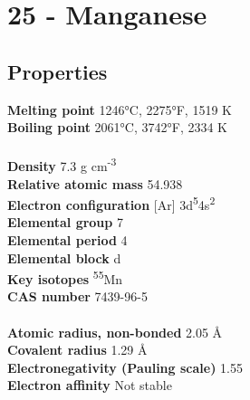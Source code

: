 \section{25 - Manganese}
\label{sec:elem-manganese}
\subsection{Properties}
\textbf{Melting point} 1246°C, 2275°F, 1519 K\\
\textbf{Boiling point} 2061°C, 3742°F, 2334 K\\
\\
\textbf{Density} 7.3 g cm\textsuperscript{-3}\\
\textbf{Relative atomic mass} 54.938\\
\textbf{Electron configuration} [Ar] 3d\textsuperscript{5}4s\textsuperscript{2}\\
\textbf{Elemental group} 7\\
\textbf{Elemental period} 4\\
\textbf{Elemental block} d\\
\textbf{Key isotopes} \textsuperscript{55}Mn\\
\textbf{CAS number} 7439-96-5\\
\\
\textbf{Atomic radius, non-bonded} 2.05 Å\\
\textbf{Covalent radius} 1.29 Å\\
\textbf{Electronegativity (Pauling scale)} 1.55\\
\textbf{Electron affinity} Not stable\\